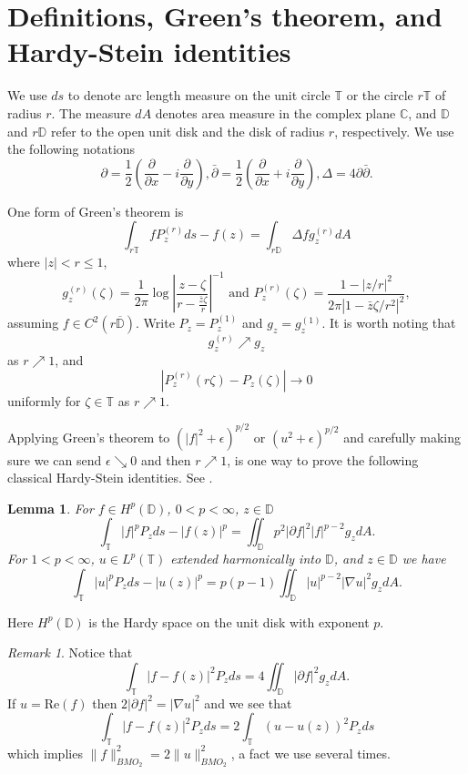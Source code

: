\documentclass[12pt]{amsart}
\newtheorem{lemma}[theorem]{Lemma}
\theoremstyle{definition}
\theoremstyle{remark}
\newtheorem{remark}[theorem]{Remark}
\numberwithin{equation}{section}
\newcommand{\D}{\mathbb{D}}
\newcommand{\cD}{\overline{\D}}
\newcommand{\C}{\mathbb{C}}
\newcommand{\T}{\mathbb{T}}
\begin{document}
\section{Definitions, Green's theorem, and Hardy-Stein identities}
We use $ds$ to denote arc length measure on the unit circle $\T$ or
the circle $r\T$ of radius $r$.  The measure $dA$ denotes area measure
in the complex plane $\C$, and $\D$ and $r\D$ refer to the open unit disk
and the disk of radius $r$, respectively.  We use the following notations
\[
\partial = \frac{1}{2}(\frac{\partial}{\partial x}-i
\frac{\partial}{\partial y}),  \bar{\partial} = \frac{1}{2}(\frac{\partial}{\partial x}+i
\frac{\partial}{\partial y}), \Delta = 4 \partial \bar{\partial}.
\] 

One form of Green's theorem is
\[
\int_{r\T} f P^{(r)}_z ds - f(z) = \int_{r\D} \Delta f g^{(r)}_z dA
\]
where $|z|<r\leq 1$, 
\[
g^{(r)}_z(\zeta) = \frac{1}{2\pi} \log \left|\frac{z-\zeta}{r-\frac{\bar{z}\zeta}{r}}\right|^{-1}
\text{ and  }
P^{(r)}_z(\zeta)  =
\frac{1-|z/r|^2}{2\pi |1-\bar{z}\zeta/r^2|^2}, 
\]
assuming $f \in C^2(r\cD)$. Write $P_z = P^{(1)}_z$ and $g_z =
g^{(1)}_{z}$.  It is worth noting that
\[
g^{(r)}_z \nearrow g_z 
\]
as $r \nearrow 1$, and 
\[
|P^{(r)}_z(r\zeta)-P_z(\zeta)|\to 0
\]
uniformly for $\zeta \in \T$ as $r \nearrow 1$.

Applying Green's theorem to $(|f|^2+\epsilon)^{p/2}$ or
$(u^2+\epsilon)^{p/2}$ and carefully making sure we can send $\epsilon
\searrow 0$ and then $r\nearrow 1$, is one way to prove the following
classical Hardy-Stein identities. See \cite{mP09}.

\begin{lemma} \label{lem:p}
For $f \in H^p(\D)$, $0<p < \infty$, $z \in \D$
\[
\int_{\T} |f|^p P_z ds - |f(z)|^p = \iint_{\D} p^2 |\partial f|^2|f|^{p-2} g_z dA.
\]
For $1<p<\infty$, $u \in L^p(\T)$ extended harmonically into $\D$, and
$z \in \D$ we have
\[
\int_{\T} |u|^p P_z ds -|u(z)|^p = p(p-1) \iint_{\D} |u|^{p-2} |\nabla u|^2 g_z dA.
\] 
\end{lemma}

Here $H^p(\D)$ is the Hardy space on the unit disk with exponent $p$.

\begin{remark} \label{remark:uf}
Notice that 
\[
\int_{\T} |f-f(z)|^2 P_z ds = 4 \iint_{\D} |\partial f|^2 g_z dA.
\]
If $u = \text{Re}(f)$ then $2|\partial f|^2 = |\nabla u|^2$ and we
see that
\[
\int_{\T} |f-f(z)|^2 P_z ds = 2\int_{\T} (u-u(z))^2 P_z ds
\]
which implies $\|f\|^2_{BMO_2} = 2 \|u\|^2_{BMO_2}$, a fact we use several
times.
\end{remark}
\end{document}
